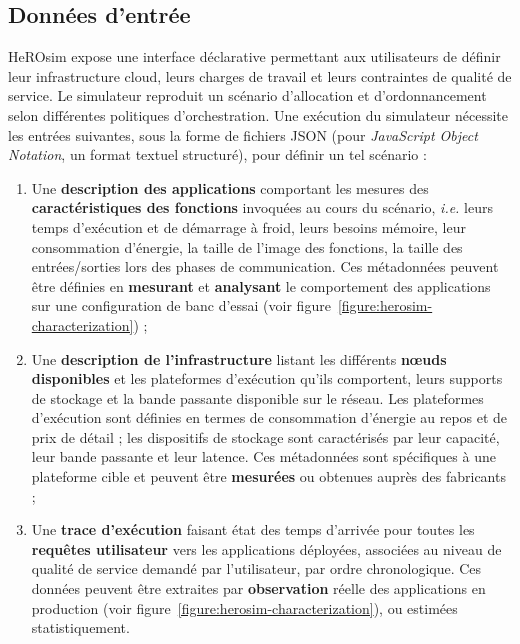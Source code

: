 \subsection{Données d'entrée}

HeROsim expose une interface déclarative permettant aux utilisateurs de définir leur infrastructure cloud, leurs charges de travail et leurs contraintes de qualité de service. Le simulateur reproduit un scénario d'allocation et d'ordonnancement selon différentes politiques d'orchestration. Une exécution du simulateur nécessite les entrées suivantes, sous la forme de fichiers \gls{JSON} (pour \textit{JavaScript Object Notation}, un format textuel structuré), pour définir un tel scénario :

\begin{enumerate}
    \item Une \textbf{description des applications} comportant les mesures des \textbf{caractéristiques des fonctions} invoquées au cours du scénario, \textit{i.e.} leurs temps d'exécution et de démarrage à froid, leurs besoins mémoire, leur consommation d'énergie, la taille de l'image des fonctions, la taille des entrées/sorties lors des phases de communication. Ces métadonnées peuvent être définies en \textbf{mesurant} et \textbf{analysant} le comportement des applications sur une configuration de banc d'essai (voir figure~\ref{figure:herosim-characterization}) ;
    \item Une \textbf{description de l'infrastructure} listant les différents \textbf{nœuds disponibles} et les plateformes d'exécution qu'ils comportent, leurs supports de stockage et la bande passante disponible sur le réseau. Les plateformes d'exécution sont définies en termes de consommation d'énergie au repos et de prix de détail ; les dispositifs de stockage sont caractérisés par leur capacité, leur bande passante et leur latence. Ces métadonnées sont spécifiques à une plateforme cible et peuvent être \textbf{mesurées} ou obtenues auprès des fabricants ;
    \item Une \textbf{trace d'exécution} faisant état des temps d'arrivée pour toutes les \textbf{requêtes utilisateur} vers les applications déployées, associées au niveau de qualité de service demandé par l'utilisateur, par ordre chronologique. Ces données peuvent être extraites par \textbf{observation} réelle des applications en production (voir figure~\ref{figure:herosim-characterization}), ou estimées statistiquement.
\end{enumerate}

